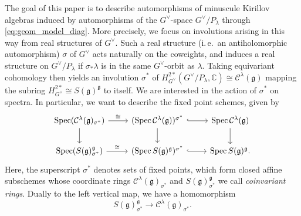 \documentclass{amsart}
\newcommand{\ie}{i.\,e.}
\newcommand{\C}{\mathbb{C}}
\newcommand{\Kir}{\mathcal{C}}
\newcommand{\g}{\mathfrak{g}}
\newcommand{\Spec}{\operatorname{Spec}}
\theoremstyle{definition}
\theoremstyle{plain}
\theoremstyle{remark}
\begin{document}
The goal of this paper is to describe automorphisms of minuscule Kirillov algebras induced by automorphisms of the $G^\vee$-space $G^\vee/P_\lambda$ through \eqref{eq:geom_model_diag}. More precisely, we focus on involutions arising in this way from real structures of $G^\vee$. Such a real structure (\ie\ an antiholomorphic automorphism) $\sigma$ of $G^\vee$ acts naturally on the coweights, and induces a real structure on $G^\vee/P_\lambda$ if $\sigma_*\lambda$ is in the same $G^\vee$-orbit as $\lambda$. Taking equivariant cohomology then yields an involution $\sigma^*$ of $H^{2*}_{G^\vee}(G^\vee/P_\lambda,\C) \cong \Kir^\lambda(\g)$ mapping the subring $H^{2*}_{G^\vee} \cong S(\g)^\g$ to itself. We are interested in the action of $\sigma^*$ on spectra. In particular, we want to describe the fixed point schemes, given by
\begin{equation}
\label{eq:fpschemes}
\begin{tikzcd}
    \Spec (\Kir^\lambda(\g)_{\sigma^*})
        \arrow[r, "\cong"]
        \arrow[d]
    &(\Spec \Kir^\lambda(\g))^{\sigma^*}
        \arrow[d]
        \arrow[r, hook]
    &\Spec \Kir^\lambda(\g)
        \arrow[d]
    \\
    \Spec (S(\g)^\g_{\sigma^*})
        \arrow[r, "\cong"]
    &(\Spec S(\g)^\g)^{\sigma^*}
        \arrow[r, hook]
    &\Spec S(\g)^\g.
\end{tikzcd}
\end{equation}
Here, the superscript $\sigma^*$ denotes sets of fixed points, which form closed affine subschemes whose coordinate rings $\Kir^\lambda(\g)_{\sigma^*}$ and $S(\g)^\g_{\sigma^*}$ we call \emph{coinvariant rings}. Dually to the left vertical map, we have a homomorphism 
\begin{equation}
\label{eq:coinv_alg_hom}
    S(\g)^\g_{\sigma^*}
    \to
    \Kir^\lambda(\g)_{\sigma^*}.
\end{equation}
\end{document}
